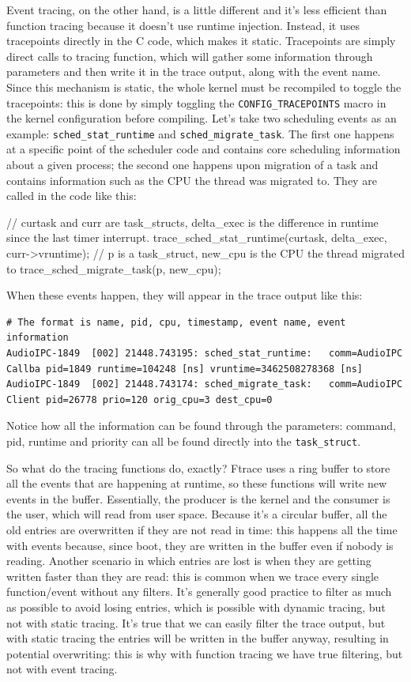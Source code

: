 Event tracing, on the other hand, is a little different and it's less efficient than function tracing because it doesn't use runtime injection. Instead, it uses tracepoints directly in the C code, which makes it static. Tracepoints are simply direct calls to tracing function, which will gather some information through parameters and then write it in the trace output, along with the event name. Since this mechanism is static, the whole kernel must be recompiled to toggle the tracepoints: this is done by simply toggling the \verb|CONFIG_TRACEPOINTS| macro in the kernel configuration before compiling. Let's take two scheduling events as an example: \verb|sched_stat_runtime| and \verb|sched_migrate_task|. The first one happens at a specific point of the scheduler code and contains core scheduling information about a given process; the second one happens upon migration of a task and contains information such as the CPU the thread was migrated to. They are called in the code like this:
\begin{code}
// curtask and curr are task_structs, delta_exec is the difference in runtime since the last timer interrupt. 
trace_sched_stat_runtime(curtask, delta_exec, curr->vruntime);
// p is a task_struct, new_cpu is the CPU the thread migrated to
trace_sched_migrate_task(p, new_cpu);
\end{code}
When these events happen, they will appear in the trace output like this:
\begin{Verbatim}[xleftmargin=-2cm,fontsize=\scriptsize]
# The format is name, pid, cpu, timestamp, event name, event information 
AudioIPC-1849  [002] 21448.743195: sched_stat_runtime:   comm=AudioIPC Callba pid=1849 runtime=104248 [ns] vruntime=3462508278368 [ns]
AudioIPC-1849  [002] 21448.743174: sched_migrate_task:   comm=AudioIPC Client pid=26778 prio=120 orig_cpu=3 dest_cpu=0
\end{Verbatim} 

Notice how all the information can be found through the parameters: command, pid, runtime and priority can all be found directly into the \verb|task_struct|.

So what do the tracing functions do, exactly? Ftrace uses a ring buffer to store all the events that are happening at runtime, so these functions will write new events in the buffer. Essentially, the producer is the kernel and the consumer is the user, which will read from user space. Because it's a circular buffer, all the old entries are overwritten if they are not read in time: this happens all the time with events because, since boot, they are written in the buffer even if nobody is reading. Another scenario in which entries are lost is when they are getting written faster than they are read: this is common when we trace every single function/event without any filters. It's generally good practice to filter as much as possible to avoid losing entries, which is possible with dynamic tracing, but not with static tracing. It's true that we can easily filter the trace output, but with static tracing the entries will be written in the buffer anyway, resulting in potential overwriting: this is why with function tracing we have true filtering, but not with event tracing.


